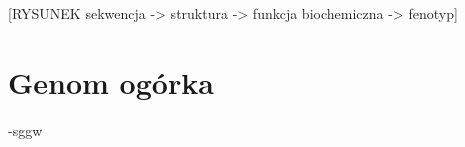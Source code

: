 [RYSUNEK sekwencja -> struktura -> funkcja biochemiczna -> fenotyp]



\section{Genom ogórka}
-sggw

